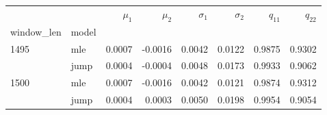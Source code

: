 \begin{tabular}{llrrrrrr}
\toprule
     &      &  $\mu_1$ &  $\mu_2$ &  $\sigma_1$ &  $\sigma_2$ &  $q_{11}$ &  $q_{22}$ \\
window_len & model &          &          &             &             &           &           \\
\midrule
1495 & mle &   0.0007 &  -0.0016 &      0.0042 &      0.0122 &    0.9875 &    0.9302 \\
     & jump &   0.0004 &  -0.0004 &      0.0048 &      0.0173 &    0.9933 &    0.9062 \\
1500 & mle &   0.0007 &  -0.0016 &      0.0042 &      0.0121 &    0.9874 &    0.9312 \\
     & jump &   0.0004 &   0.0003 &      0.0050 &      0.0198 &    0.9954 &    0.9054 \\
\bottomrule
\end{tabular}
